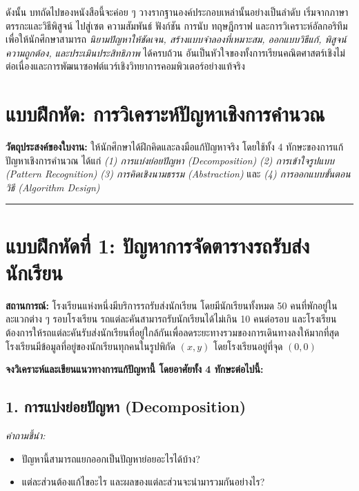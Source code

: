 ดังนั้น บทถัดไปของหนังสือนี้จะค่อย ๆ วางรากฐานองค์ประกอบเหล่านั้นอย่างเป็นลำดับ เริ่มจากภาษาตรรกะและวิธีพิสูจน์ ไปสู่เซต ความสัมพันธ์ ฟังก์ชัน การนับ ทฤษฎีกราฟ และการวิเคราะห์อัลกอริทึม เพื่อให้นักศึกษาสามารถ \textit{นิยามปัญหาให้ชัดเจน, สร้างแบบจำลองที่เหมาะสม, ออกแบบวิธีแก้, พิสูจน์ความถูกต้อง, และประเมินประสิทธิภาพ} ได้ครบถ้วน อันเป็นหัวใจของทั้งการเรียนคณิตศาสตร์เชิงไม่ต่อเนื่องและการพัฒนาซอฟต์แวร์เชิงวิทยาการคอมพิวเตอร์อย่างแท้จริง

\newpage
\section{แบบฝึกหัด: การวิเคราะห์ปัญหาเชิงการคำนวณ}

\noindent
\textbf{วัตถุประสงค์ของใบงาน:}  
ให้นักศึกษาได้ฝึกคิดและลงมือแก้ปัญหาจริง โดยใช้ทั้ง 4 ทักษะของการแก้ปัญหาเชิงการคำนวณ ได้แก่  
\textit{(1) การแบ่งย่อยปัญหา (Decomposition)}  
\textit{(2) การเข้าใจรูปแบบ (Pattern Recognition)}  
\textit{(3) การคิดเชิงนามธรรม (Abstraction)} และ  
\textit{(4) การออกแบบขั้นตอนวิธี (Algorithm Design)}  

\vspace{1em}
\hrule
\vspace{1em}

\section*{แบบฝึกหัดที่ 1: ปัญหาการจัดตารางรถรับส่งนักเรียน}

\textbf{สถานการณ์:}  
โรงเรียนแห่งหนึ่งมีบริการรถรับส่งนักเรียน โดยมีนักเรียนทั้งหมด 50 คนที่พักอยู่ในละแวกต่าง ๆ รอบโรงเรียน  
รถแต่ละคันสามารถรับนักเรียนได้ไม่เกิน 10 คนต่อรอบ และโรงเรียนต้องการให้รถแต่ละคันรับส่งนักเรียนที่อยู่ใกล้กันเพื่อลดระยะทางรวมของการเดินทางลงให้มากที่สุด  
โรงเรียนมีข้อมูลที่อยู่ของนักเรียนทุกคนในรูปพิกัด $(x, y)$ โดยโรงเรียนอยู่ที่จุด $(0,0)$

\vspace{1em}
\textbf{จงวิเคราะห์และเขียนแนวทางการแก้ปัญหานี้ โดยอาศัยทั้ง 4 ทักษะต่อไปนี้:}

\subsection*{1. การแบ่งย่อยปัญหา (Decomposition)}
\textit{คำถามชี้นำ:}  
\begin{itemize}
	\item ปัญหานี้สามารถแยกออกเป็นปัญหาย่อยอะไรได้บ้าง?  
	\item แต่ละส่วนต้องแก้ไขอะไร และผลของแต่ละส่วนจะนำมารวมกันอย่างไร?
\end{itemize}


